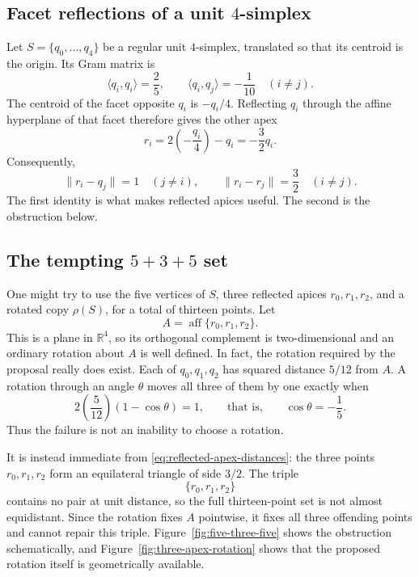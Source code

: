 \documentclass[11pt]{article}
\begin{document}
\subsection{Facet reflections of a unit \texorpdfstring{$4$}{4}-simplex}

Let $S=\{q_0,\dots,q_4\}$ be a regular unit $4$-simplex, translated so that
its centroid is the origin.  Its Gram matrix is
\[
 \langle q_i,q_i\rangle=\frac25,
 \qquad
 \langle q_i,q_j\rangle=-\frac1{10}\quad(i\ne j).
\]
The centroid of the facet opposite $q_i$ is $-q_i/4$.  Reflecting $q_i$
through the affine hyperplane of that facet therefore gives the other apex
\[
 r_i=2\left(-\frac{q_i}{4}\right)-q_i=-\frac32q_i.
\]
Consequently,
\begin{equation}
 \lVert r_i-q_j\rVert=1\quad(j\ne i),
 \qquad
 \lVert r_i-r_j\rVert=\frac32\quad(i\ne j).
 \label{eq:reflected-apex-distances}
\end{equation}
The first identity is what makes reflected apices useful.  The second is the
obstruction below.

\subsection{The tempting \texorpdfstring{$5+3+5$}{5+3+5} set}

One might try to use the five vertices of $S$, three reflected apices
$r_0,r_1,r_2$, and a rotated copy $\rho(S)$, for a total of thirteen points.
Let
\[
 A=\operatorname{aff}\{r_0,r_1,r_2\}.
\]
This is a plane in $\mathbb R^4$, so its orthogonal complement is
two-dimensional and an ordinary rotation about $A$ is well defined.  In fact,
the rotation required by the proposal really does exist.  Each of
$q_0,q_1,q_2$ has squared distance $5/12$ from $A$.  A rotation through an
angle $\theta$ moves all three of them by one exactly when
\[
 2\left(\frac5{12}\right)(1-\cos\theta)=1,
 \qquad\text{that is,}\qquad
 \cos\theta=-\frac15.
\]
Thus the failure is not an inability to choose a rotation.

It is instead immediate from \eqref{eq:reflected-apex-distances}: the three
points $r_0,r_1,r_2$ form an equilateral triangle of side $3/2$.  The triple
\[
 \{r_0,r_1,r_2\}
\]
contains no pair at unit distance, so the full thirteen-point set is not
almost equidistant.  Since the rotation fixes $A$ pointwise, it fixes all
three offending points and cannot repair this triple.  Figure~\ref{fig:five-three-five}
shows the obstruction schematically, and Figure~\ref{fig:three-apex-rotation}
shows that the proposed rotation itself is geometrically available.
\end{document}
